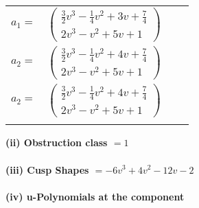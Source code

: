 \documentclass[1p]{elsarticle_modified}
\theoremstyle{definition}
\begin{document}
\begin{tabular}{m{7pt} m{180pt} m{7pt} m{180pt} }
\flushright $a_{1}=$&$\begin{pmatrix}\frac{3}{2} v^3-\frac{1}{4} v^2+3 v+\frac{7}{4}\\2 v^3- v^2+5 v+1\end{pmatrix}$ \\
\flushright $a_{2}=$&$\begin{pmatrix}\frac{3}{2} v^3-\frac{1}{4} v^2+4 v+\frac{7}{4}\\2 v^3- v^2+5 v+1\end{pmatrix}$\\ \flushright $a_{2}=$&$\begin{pmatrix}\frac{3}{2} v^3-\frac{1}{4} v^2+4 v+\frac{7}{4}\\2 v^3- v^2+5 v+1\end{pmatrix}$\\&\end{tabular}
\flushleft \textbf{(ii) Obstruction class $= 1$}\\~\\
\flushleft \textbf{(iii) Cusp Shapes $= -6 v^3+4 v^2-12 v-2$}\\~\\
\newpage\renewcommand{\arraystretch}{1}
\flushleft \textbf{(iv) u-Polynomials at the component}\newline \\
\end{document}
